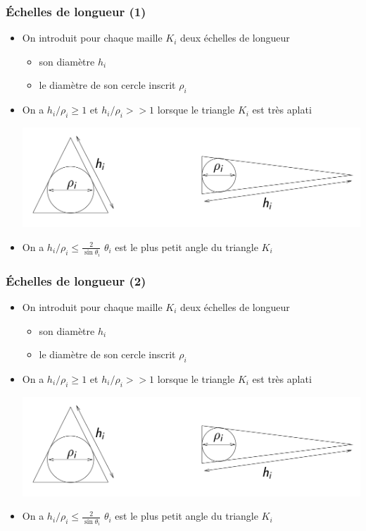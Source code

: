 \documentclass{beamer}
\begin{document}
\begin{frame}
\frametitle{Échelles de longueur (1)}
\begin{itemize}
\item On introduit pour chaque maille $K_i$ deux échelles de longueur
\begin{itemize}
\item son diamètre $h_i$
\item le diamètre de son cercle inscrit $\rho_i$
\end{itemize}

\item On a $h_i/\rho_i \geq 1$  et $h_i/\rho_i >> 1$ lorsque le triangle $K_i$ est très  aplati
\begin{center}
\includegraphics[scale=0.25]{maillage02.png} 
\end{center}
\item On a $h_i/\rho_i \leq \frac{2}{\sin\theta_i}$ $\theta_i$ est le plus petit angle du triangle $K_i$
\end{itemize}
\end{frame}

\begin{frame}
\frametitle{Échelles de longueur (2)}
\begin{itemize}
\item On introduit pour chaque maille $K_i$ deux échelles de longueur
\begin{itemize}
\item son diamètre $h_i$
\item le diamètre de son cercle inscrit $\rho_i$
\end{itemize}

\item On a $h_i/\rho_i \geq 1$  et $h_i/\rho_i >> 1$ lorsque le triangle $K_i$ est très  aplati
\begin{center}
\includegraphics[scale=0.25]{maillage02.png} 
\end{center}
\item On a $h_i/\rho_i \leq \frac{2}{\sin\theta_i}$ $\theta_i$ est le plus petit angle du triangle $K_i$
\end{itemize}
\end{frame}
\end{document}
